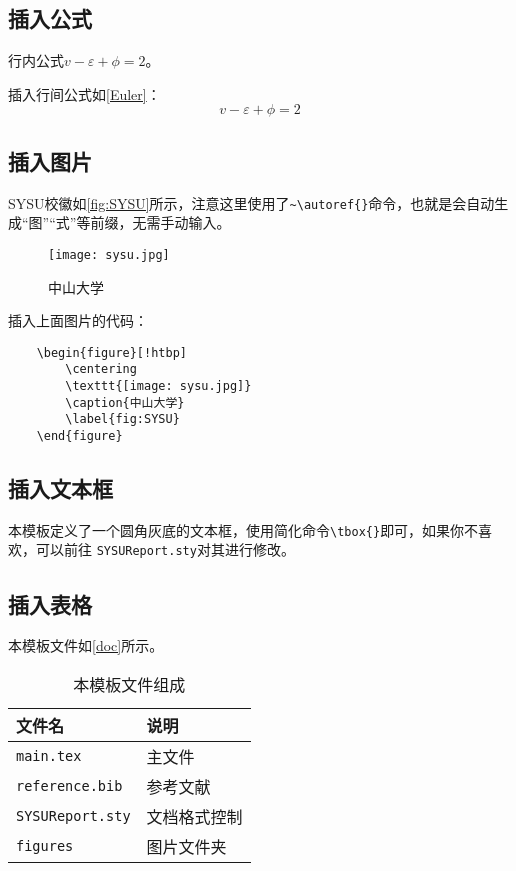 \documentclass{SYSUReport}
\begin{document}
\subsection{插入公式}
行内公式$v-\varepsilon+\phi=2$。

插入行间公式如\autoref{Euler}：
\begin{equation}
    v-\varepsilon+\phi=2
    \label{Euler}
\end{equation}

\subsection{插入图片}
SYSU校徽如\autoref{fig:SYSU}所示，注意这里使用了\verb|~\autoref{}|命令，也就是会自动生成“图”“式”等前缀，无需手动输入。

\begin{figure}[!htbp]
    \centering
    \texttt{[image: sysu.jpg]}
    \caption{中山大学}
    \label{fig:SYSU}
\end{figure}

插入上面图片的代码：

\begin{verbatim}
    \begin{figure}[!htbp]
        \centering
        \texttt{[image: sysu.jpg]}
        \caption{中山大学}
        \label{fig:SYSU}
    \end{figure}
\end{verbatim}

\subsection{插入文本框}
本模板定义了一个圆角灰底的文本框，使用简化命令\verb|\tbox{}|即可，如果你不喜欢，可以前往 \texttt{SYSUReport.sty}对其进行修改。


\subsection{插入表格}
本模板文件如\autoref{doc}所示。
\begin{table}[!htbp]
    \centering
    \begin{tabular}{l  | l}
        \hline
        文件名                  & 说明         \\
        \hline
        \texttt{main.tex}       & 主文件       \\
        \texttt{reference.bib}  & 参考文献     \\
        \texttt{SYSUReport.sty} & 文档格式控制 \\
        \texttt{figures}        & 图片文件夹   \\
        \hline
    \end{tabular}
    \caption{本模板文件组成}
    \label{doc}
\end{table}
\end{document}
